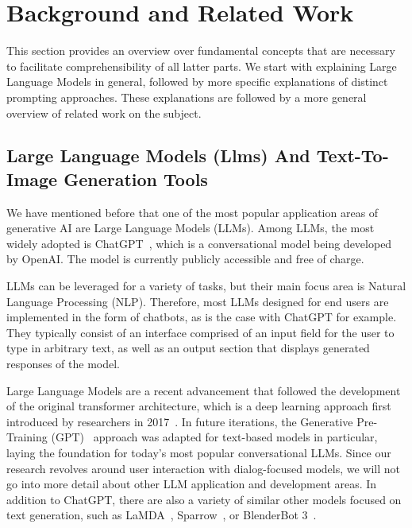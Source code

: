 \section{Background and Related Work}
\label{sec:background-and-related-work}

This section provides an overview over fundamental concepts that are necessary to
facilitate comprehensibility of all latter parts.
We start with explaining Large Language Models in general, followed by more specific explanations
of distinct prompting approaches.
These explanations are followed by a more general overview of related work on the subject.


\subsection{Large Language Models (Llms) And Text-To-Image Generation Tools}
\label{subsec:large-language-models-(llms)}
We have mentioned before that one of the most popular application areas of generative AI
are Large Language Models (LLMs).
Among LLMs, the most widely adopted is ChatGPT~\cite{openai_chatgpt_2023}, which is a
conversational model being developed by OpenAI\@.
The model is currently publicly accessible and free of charge.

LLMs can be leveraged for a variety of tasks, but their main focus area is Natural Language Processing
(NLP).
Therefore, most LLMs designed for end users are implemented in the form of chatbots,
as is the case with ChatGPT for example.
They typically consist of an interface comprised of an input field for the user to type in arbitrary
text, as well as an output section that displays generated responses of the model.

Large Language Models are a recent advancement that followed the development of the original
transformer architecture, which is a deep learning approach first introduced by researchers in 2017~\cite{vaswani_attention_2017}.
In future iterations, the Generative Pre-Training (GPT)~\cite{radford_improving_2018} approach
was adapted for text-based models in particular, laying the foundation for today's most
popular conversational LLMs.
Since our research revolves around user interaction with dialog-focused models, we will not go into
more detail about other LLM application and development areas.
In addition to ChatGPT, there are also a variety of similar other models focused on text generation,
such as LaMDA~\cite{thoppilan_lamda_2022}, Sparrow~\cite{glaese_improving_2022}, or
BlenderBot 3~\cite{shuster_blenderbot_2022}.

